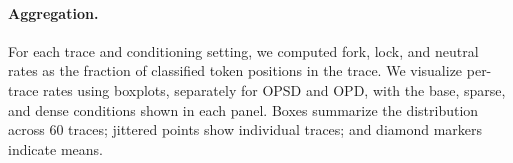 \paragraph{Aggregation.}
For each trace and conditioning setting, we computed fork, lock, and neutral
rates as the fraction of classified token positions in the trace. We visualize
per-trace rates using boxplots, separately for OPSD and OPD, with the base,
sparse, and dense conditions shown in each panel. Boxes summarize the
distribution across 60 traces; jittered points show individual traces; and
diamond markers indicate means.
